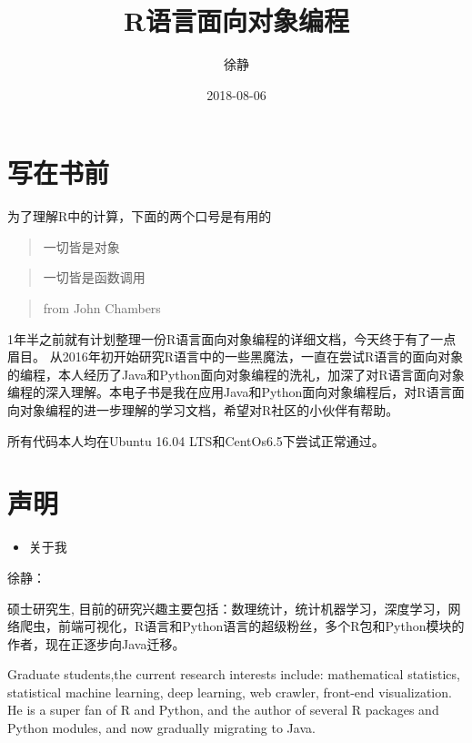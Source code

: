 \documentclass[]{book}
\title{R语言面向对象编程}
\author{徐静}
\date{2018-08-06}
\providecommand{\tightlist}{%
  \setlength{\itemsep}{0pt}\setlength{\parskip}{0pt}}
\begin{document}
\maketitle

{
\setcounter{tocdepth}{1}
\tableofcontents
}
\chapter*{写在书前}

为了理解R中的计算，下面的两个口号是有用的

\begin{quote}
一切皆是对象
\end{quote}

\begin{quote}
一切皆是函数调用
\end{quote}

\begin{quote}
from John Chambers
\end{quote}

1年半之前就有计划整理一份R语言面向对象编程的详细文档，今天终于有了一点眉目。
从2016年初开始研究R语言中的一些黑魔法，一直在尝试R语言的面向对象的编程，本人经历了Java和Python面向对象编程的洗礼，加深了对R语言面向对象编程的深入理解。本电子书是我在应用Java和Python面向对象编程后，对R语言面向对象编程的进一步理解的学习文档，希望对R社区的小伙伴有帮助。

所有代码本人均在Ubuntu 16.04 LTS和CentOs6.5下尝试正常通过。

\chapter*{声明}

\begin{itemize}
\tightlist
\item
  关于我
\end{itemize}

徐静：

硕士研究生,
目前的研究兴趣主要包括：数理统计，统计机器学习，深度学习，网络爬虫，前端可视化，R语言和Python语言的超级粉丝，多个R包和Python模块的作者，现在正逐步向Java迁移。

Graduate students,the current research interests include: mathematical
statistics, statistical machine learning, deep learning, web crawler,
front-end visualization. He is a super fan of R and Python, and the
author of several R packages and Python modules, and now gradually
migrating to Java.
\end{document}
